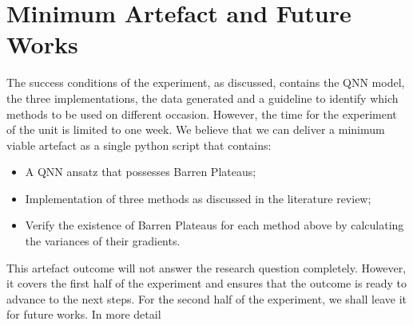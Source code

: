 \section{Minimum Artefact and Future Works}

The success conditions of the experiment, as discussed, contains the QNN model, the three implementations, the data generated and a guideline to identify which methods to be used on different occasion.
However, the time for the experiment of the unit is limited to one week. We believe that we can deliver a minimum viable artefact as a single python script that contains:
\begin{itemize}
    \item A QNN ansatz that possesses Barren Plateaus;
    \item Implementation of three methods as discussed in the literature review;
    \item Verify the existence of Barren Plateaus for each method above by calculating the variances of their gradients.
\end{itemize}

This artefact outcome will not answer the research question completely. 
However, it covers the first half of the experiment and ensures that the outcome is ready to advance to the next steps.
For the second half of the experiment, we shall leave it for future works.
In more detail
